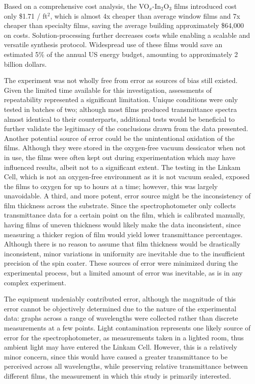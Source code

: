 \documentclass[a4paper]{article}
\begin{document}
Based on a comprehensive cost analysis, the VO$_x$-In$_2$O$_3$ films introduced cost only \$1.71 / ft$^2$, which is almost 4x cheaper than average window films and 7x cheaper than specialty films, saving the average building approximately \$64,000 on costs. Solution-processing further decreases costs while enabling a scalable and versatile synthesis protocol. Widespread use of these films would save an estimated 5\% of the annual US energy budget, amounting to approximately 2 billion dollars.

The experiment was not wholly free from error as sources of bias still existed. Given the limited time available for this investigation, assessments of repeatability represented a significant limitation. Unique conditions were only tested in batches of two; although most films produced transmittance spectra almost identical to their counterparts, additional tests would be beneficial to further validate the legitimacy of the conclusions drawn from the data presented. Another potential source of error could be the unintentional oxidation of the films. Although they were stored in the oxygen-free vacuum dessicator when not in use, the films were often kept out during experimentation which may have influenced results, albeit not to a significant extent. The testing in the Linkam Cell, which is not an oxygen-free environment as it is not vacuum sealed, exposed the films to oxygen for up to hours at a time; however, this was largely unavoidable. A third, and more potent, error source might be the inconsistency of film thickness across the substrate. Since the spectrophotometer only collects transmittance data for a certain point on the film, which is calibrated manually, having films of uneven thickness would likely make the data inconsistent, since measuring a thicker region of film would yield lower transmittance percentages. Although there is no reason to assume that film thickness would be drastically inconsistent, minor variations in uniformity are inevitable due to the insufficient precision of the spin coater. These sources of error were minimized during the experimental process, but a limited amount of error was inevitable, as is in any complex experiment.

The equipment undeniably contributed error, although the magnitude of this error cannot be objectively determined due to the nature of the experimental data: graphs across a range of wavelengths were collected rather than discrete measurements at a few points. Light contamination represents one likely source of error for the spectrophotometer, as measurements taken in a lighted room, thus ambient light may have entered the Linkam Cell. However, this is a relatively minor concern, since this would have caused a greater transmittance to be perceived across all wavelengths, while preserving relative transmittance between different films, the measurement in which this study is primarily interested.
\end{document}
